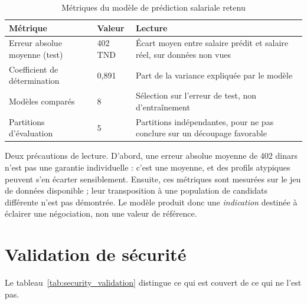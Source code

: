 \begin{table}[htbp]
  \centering
  \caption{Métriques du modèle de prédiction salariale retenu}
  \label{tab:model_metrics}
  \begin{tabularx}{\textwidth}{L{5.0cm} L{3.2cm} X}
    \toprule
    \textbf{Métrique} & \textbf{Valeur} & \textbf{Lecture} \\
    \midrule
    Erreur absolue moyenne (test) & 402 TND & Écart moyen entre salaire prédit et salaire réel, sur données non vues \\
    Coefficient de détermination  & 0,891   & Part de la variance expliquée par le modèle \\
    Modèles comparés              & 8       & Sélection sur l'erreur de test, non d'entraînement \\
    Partitions d'évaluation       & 5       & Partitions indépendantes, pour ne pas conclure sur un découpage favorable \\
    \bottomrule
  \end{tabularx}
\end{table}

Deux précautions de lecture. D'abord, une erreur absolue moyenne de 402 dinars
n'est pas une garantie individuelle : c'est une moyenne, et des profils
atypiques peuvent s'en écarter sensiblement. Ensuite, ces métriques sont
mesurées sur le jeu de données disponible ; leur transposition à une population
de candidats différente n'est pas démontrée. Le modèle produit donc une
\emph{indication} destinée à éclairer une négociation, non une valeur de
référence.

\section{Validation de sécurité}
\label{sec:security_validation}

Le tableau~\ref{tab:security_validation} distingue ce qui est couvert de ce
qui ne l'est pas.

